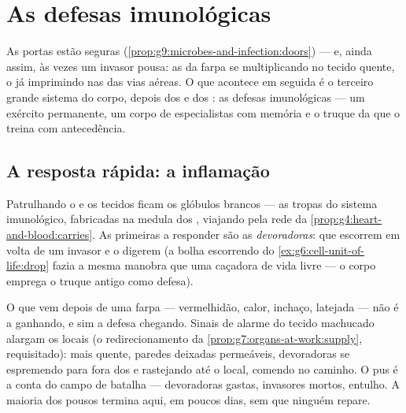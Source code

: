 \chapter{As defesas imunológicas}\label{ch:g9:immune-defenses}

As portas estão seguras
(\cref{prop:g9:microbes-and-infection:doors}) --- e, ainda
assim, às vezes um invasor pousa: as  da farpa se
multiplicando no tecido quente, o  já imprimindo nas
 das vias aéreas. O que acontece em seguida é o
terceiro grande sistema do corpo, depois dos  e dos
: as defesas imunológicas --- um exército
permanente, um corpo de especialistas com memória e o truque
da  que o treina com antecedência.

\section{A resposta rápida: a inflamação}

\begin{definition}\label{def:g9:immune-defenses:standing}
Patrulhando o  e os tecidos ficam os glóbulos
brancos --- as tropas do sistema
imunológico, fabricadas na medula dos , viajando pela
rede da \cref{prop:g4:heart-and-blood:carries}. As primeiras
a responder são as \emph{devoradoras}:  que escorrem
em volta de um invasor e o digerem (a bolha escorrendo do
\cref{ex:g6:cell-unit-of-life:drop} fazia a mesma manobra que
uma caçadora de vida livre --- o corpo emprega o truque
antigo como defesa).
\end{definition}

\begin{proposition}\label{prop:g9:immune-defenses:inflammation}
O que vem depois de uma farpa --- vermelhidão, calor,
inchaço, latejada --- não é a  ganhando, e sim a
defesa chegando. Sinais de alarme do tecido machucado alargam
os  locais (o redirecionamento da
\cref{prop:g7:organs-at-work:supply}, requisitado): mais
 quente, paredes deixadas permeáveis, devoradoras se
espremendo para fora dos  e rastejando até o local,
comendo  no caminho. O pus é a conta do campo de
batalha --- devoradoras gastas, invasores mortos, entulho. A
maioria dos pousos termina aqui, em poucos dias, sem que
ninguém repare.
\end{proposition}
\admitted


